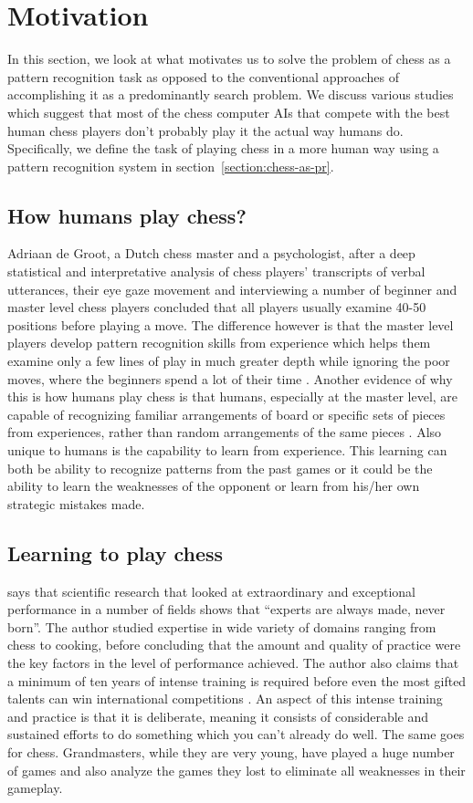 \section{Motivation}
In this section, we look at what motivates us to solve the problem of chess as a 
pattern recognition task as opposed to the conventional approaches of 
accomplishing it as a predominantly search problem. We discuss various 
studies which suggest that most of the chess computer AIs that compete with the 
best human chess players don't probably play it the actual way humans do. 
Specifically, we define the task of playing chess in a more human way using a 
pattern recognition system in section~\ref{section:chess-as-pr}.

\subsection{How humans play chess?}
Adriaan de Groot, a Dutch chess master and a psychologist, after a deep 
statistical and interpretative analysis of chess players' transcripts of verbal 
utterances, their eye gaze movement and interviewing a number of beginner and 
master level chess players concluded that all players usually examine 40-50 
positions before playing a move. The difference however 
is that the master level players develop pattern recognition skills from 
experience which helps them examine only a few lines of play in much greater 
depth while ignoring the poor moves, where the beginners spend a lot of their 
time \cite{de1996perception}. Another evidence of why this is how humans 
play chess is that humans, especially at the master level, are capable of 
recognizing familiar arrangements of board or specific sets of pieces 
from experiences, rather than random arrangements of the same pieces  
\cite{chase1973perception}. Also unique to humans is the capability to learn 
from experience. This learning can both be ability to recognize patterns from 
the past games or it could be the ability to learn the weaknesses of the 
opponent or learn from his/her own strategic mistakes made.

\subsection{Learning to play chess}
\citet{ericsson2007making} says that scientific research that 
looked at extraordinary and exceptional performance in a number of fields shows 
that ``experts are always made, never born''. The author studied expertise in 
wide variety of domains ranging from chess to cooking, before concluding that 
the amount and quality of practice were the key factors in the level of 
performance achieved. The author also claims that a minimum of ten years of 
intense training is required before even the most gifted talents can 
win international competitions \cite{ericsson2006cambridge}. An aspect of this 
intense training and practice is that it is deliberate, meaning it 
consists of considerable and sustained efforts to do something which you can't 
already do well. The same goes for chess. Grandmasters, while they are very 
young, have played a huge number of games and also analyze the games they lost 
to eliminate all weaknesses in their gameplay.\\

